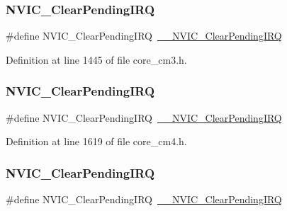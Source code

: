 \subsubsection{\texorpdfstring{N\+V\+I\+C\+\_\+\+Clear\+Pending\+I\+RQ}{NVIC\_ClearPendingIRQ}\hspace{0.1cm}{\footnotesize\ttfamily [8/13]}}
{\footnotesize\ttfamily \#define N\+V\+I\+C\+\_\+\+Clear\+Pending\+I\+RQ~\hyperlink{group___c_m_s_i_s___core___n_v_i_c_functions_ga562a86dbdf14827d0fee8fdafb04d191}{\+\_\+\+\_\+\+N\+V\+I\+C\+\_\+\+Clear\+Pending\+I\+RQ}}



Definition at line 1445 of file core\+\_\+cm3.\+h.

\mbox{\label{group___c_m_s_i_s___core___n_v_i_c_functions_ga590cf113000a079b1f0ea3dcd5b5316c}} 
\subsubsection{\texorpdfstring{N\+V\+I\+C\+\_\+\+Clear\+Pending\+I\+RQ}{NVIC\_ClearPendingIRQ}\hspace{0.1cm}{\footnotesize\ttfamily [9/13]}}
{\footnotesize\ttfamily \#define N\+V\+I\+C\+\_\+\+Clear\+Pending\+I\+RQ~\hyperlink{group___c_m_s_i_s___core___n_v_i_c_functions_ga562a86dbdf14827d0fee8fdafb04d191}{\+\_\+\+\_\+\+N\+V\+I\+C\+\_\+\+Clear\+Pending\+I\+RQ}}



Definition at line 1619 of file core\+\_\+cm4.\+h.

\mbox{\label{group___c_m_s_i_s___core___n_v_i_c_functions_ga590cf113000a079b1f0ea3dcd5b5316c}} 
\subsubsection{\texorpdfstring{N\+V\+I\+C\+\_\+\+Clear\+Pending\+I\+RQ}{NVIC\_ClearPendingIRQ}\hspace{0.1cm}{\footnotesize\ttfamily [10/13]}}
{\footnotesize\ttfamily \#define N\+V\+I\+C\+\_\+\+Clear\+Pending\+I\+RQ~\hyperlink{group___c_m_s_i_s___core___n_v_i_c_functions_ga562a86dbdf14827d0fee8fdafb04d191}{\+\_\+\+\_\+\+N\+V\+I\+C\+\_\+\+Clear\+Pending\+I\+RQ}}



